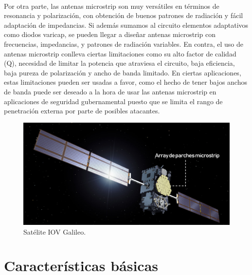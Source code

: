 \\
\par Por otra parte, las antenas microstrip son muy versátiles en términos de resonancia y polarización, con obtención de buenos patrones de radiación y fácil adaptación de impedancias. Si además sumamos al circuito elementos adaptativos como diodos varicap, se pueden llegar a diseñar antenas microstrip con frecuencias, impedancias, y patrones de radiación variables. En contra, el uso de antenas microstrip conlleva ciertas limitaciones como su alto factor de calidad (Q), necesidad de limitar la potencia que atraviesa el circuito, baja eficiencia, baja pureza de polarización y ancho de banda limitado. En ciertas aplicaciones, estas limitaciones pueden ser usadas a favor, como el hecho de tener bajos anchos de banda puede ser deseado a la hora de usar las antenas microstrip en aplicaciones de seguridad gubernamental puesto que se limita el rango de penetración externa por parte de posibles atacantes.

\begin{figure}[h]
    \centering
        \includegraphics[width=15cm]{archivos/sate}
        \caption{Satélite IOV Galileo. \citep{Pippes2011}}
        \label{fig:satgalileo}
\end{figure}

\section{Características básicas}

